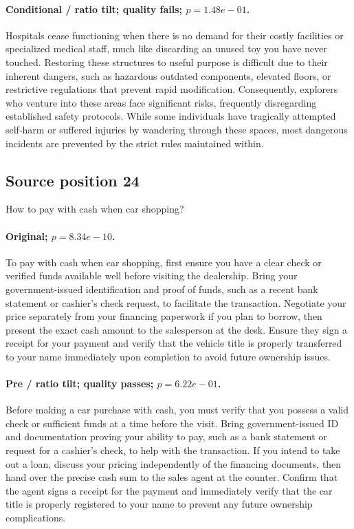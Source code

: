 \paragraph{Conditional / ratio tilt; quality fails; $p=1.48e-01$.} Hospitals cease functioning when there is no demand for their costly facilities or specialized medical staff, much like discarding an unused toy you have never touched. Restoring these structures to useful purpose is difficult due to their inherent dangers, such as hazardous outdated components, elevated floors, or restrictive regulations that prevent rapid modification. Consequently, explorers who venture into these areas face significant risks, frequently disregarding established safety protocols. While some individuals have tragically attempted self-harm or suffered injuries by wandering through these spaces, most dangerous incidents are prevented by the strict rules maintained within.

\subsection*{Source position 24}
How to pay with cash when car shopping?

\paragraph{Original; $p=8.34e-10$.} To pay with cash when car shopping, first ensure you have a clear check or verified funds available well before visiting the dealership. Bring your government-issued identification and proof of funds, such as a recent bank statement or cashier's check request, to facilitate the transaction. Negotiate your price separately from your financing paperwork if you plan to borrow, then present the exact cash amount to the salesperson at the desk. Ensure they sign a receipt for your payment and verify that the vehicle title is properly transferred to your name immediately upon completion to avoid future ownership issues.


\paragraph{Pre / ratio tilt; quality passes; $p=6.22e-01$.} Before making a car purchase with cash, you must verify that you possess a valid check or sufficient funds at a time before the visit. Bring government-issued ID and documentation proving your ability to pay, such as a bank statement or request for a cashier's check, to help with the transaction. If you intend to take out a loan, discuss your pricing independently of the financing documents, then hand over the precise cash sum to the sales agent at the counter. Confirm that the agent signs a receipt for the payment and immediately verify that the car title is properly registered to your name to prevent any future ownership complications.

